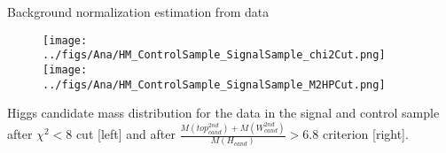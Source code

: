 \begin{frame}{Background normalization estimation from data}
\vspace{-.2cm}
\begin{figure}[!Hhtbp]
  \begin{center}
    \texttt{[image: ../figs/Ana/HM\_ControlSample\_SignalSample\_chi2Cut.png]}
    \texttt{[image: ../figs/Ana/HM\_ControlSample\_SignalSample\_M2HPCut.png]}
  \end{center}
\end{figure}

\vspace{-.2cm}
    \begin{block}{}
      \tiny \centering Higgs candidate mass distribution for the data in the signal and control sample after $\chi^{2}<8$ cut [left] and after $\frac{M(top^{2nd}_{cand})+M(W^{2nd}_{cand})}{M(H_{cand})}>6.8$ criterion [right].
    \end{block}

\end{frame}

